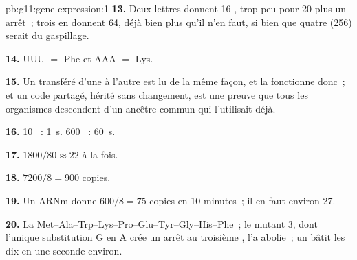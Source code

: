 \begin{solution}{pb:g11:gene-expression:1}
\textbf{13.} Deux lettres donnent 16 , trop peu pour 20  plus un arrêt~; trois en donnent 64, déjà bien plus qu'il n'en
faut, si bien que quatre (256) serait du gaspillage.

\textbf{14.} UUU $=$ Phe et AAA $=$ Lys.

\textbf{15.} Un  transféré d'une  à l'autre est lu de la même
façon, et la  fonctionne donc~; et un code partagé, hérité
sans changement, est une preuve que tous les organismes descendent d'un
ancêtre commun qui l'utilisait déjà.

\textbf{16.} 10 ~: \qty{1}{s}. 600 ~: \qty{60}{s}.

\textbf{17.} $1800/80 \approx 22$  à la fois.

\textbf{18.} $7200/8 = 900$ copies.

\textbf{19.} Un ARNm donne $600/8 = 75$ copies en 10 minutes~; il en
faut environ 27.

\textbf{20.} La 
Met--Ala--Trp--Lys--Pro--Glu--Tyr--Gly--His--Phe~; le mutant 3, dont
l'unique substitution G en A crée un arrêt au troisième , l'a
abolie~; un  bâtit les dix  en une seconde
environ.
\end{solution}
